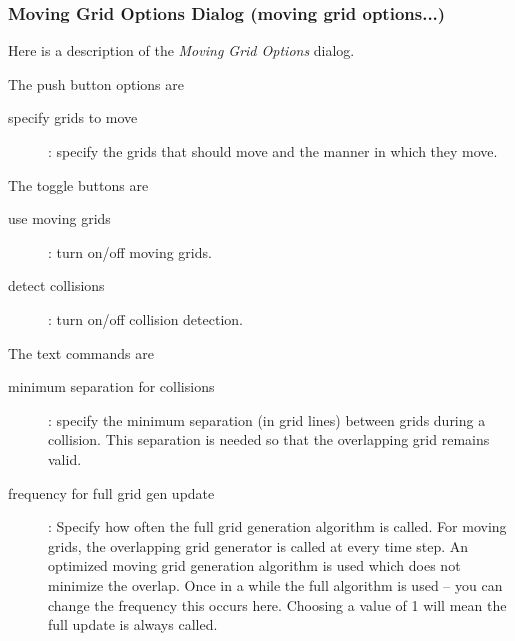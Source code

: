 \subsubsection{Moving Grid Options Dialog (moving grid options...)}\label{sec:movingGridOptions}

Here is a description of the {\em Moving Grid Options} dialog.

\noindent The push button options are
\begin{description}
  \item[\qquad specify grids to move] : specify the grids that should move and the manner in which they move.
\end{description}

\noindent The toggle buttons are
\begin{description}
  \item[\qquad use moving grids] : turn on/off moving grids.
  \item[\qquad detect collisions] : turn on/off collision detection.
\end{description}

\noindent The text commands are
\begin{description}
  \item[\qquad minimum separation for collisions] : specify the minimum separation (in grid lines) 
           between grids during a collision. This separation is needed so that the overlapping grid remains valid.
  \item[\qquad frequency for full grid gen update] : Specify how often the full grid generation algorithm is
    called. For moving grids, the
overlapping grid generator is called at every time step.  An optimized moving grid
generation algorithm is used which does not minimize the overlap.  Once in a
while the full algorithm is used -- you can change the frequency this occurs
here. Choosing a value of 1 will mean the full update is always called.
\end{description}

